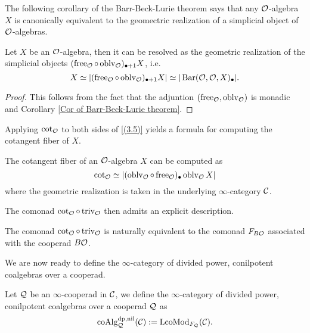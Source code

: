 The following corollary of the Barr-Beck-Lurie theorem says that any ${\mathcal{O}}$-algebra $X$ is canonically equivalent to the geomectric realization of a simplicial object of ${\mathcal{O}}$-algebras.
\begin{proposition}
\label{free resolutino of O-algebras}
Let $X$ be an ${\mathcal{O}}$-algebra, then it can be resolved as the geometric realization of the simplicial objects $(\operatorname{free}_{{\mathcal{O}}}\circ \operatorname{oblv}_{{\mathcal{O}}})_{\bullet + 1}X$, i.e. 
\begin{equation}
\label{(3.5)}
    X \simeq
|(\operatorname{free}_{{\mathcal{O}}}\circ \operatorname{oblv}_{{\mathcal{O}}})_{\bullet + 1}X|
\simeq |\operatorname{Bar}({\mathcal{O}}, {\mathcal{O}}, X)_{\bullet}|.
\end{equation}
\end{proposition}
\begin{proof}
    This follows from the fact that the adjuntion $(\operatorname{free}_{{\mathcal{O}}}, \operatorname{oblv}_{{\mathcal{O}}})$ is monadic and Corollary \ref{Cor of Barr-Beck-Lurie theorem}.
    
\end{proof}
Applying $\cot_{{\mathcal{O}}}$ to both sides of \eqref{(3.5)} yields a formula for computing the cotangent fiber of $X$. 
\begin{corollary}
\cite[Proposition 4.4]{Heuts_Koszul}
The cotangent fiber of an ${\mathcal{O}}$-algebra $X$ can be computed as 
$$
\cot_{{\mathcal{O}}} \simeq 
|(\operatorname{oblv}_{{\mathcal{O}}}\circ \operatorname{free}_{{\mathcal{O}}})_{\bullet}\operatorname{oblv}_{{\mathcal{O}}}X|
$$
where the geometric realization is taken in the underlying $\infty$-category ${\mathcal{C}}$.
\end{corollary}

The comonad $\cot_{{\mathcal{O}}}\circ \operatorname{triv}_{{\mathcal{O}}}$ then admits an explicit description.
\begin{proposition}
\label{cot triv is F_BO}
\cite[Proposition 4.5]{Heuts_Koszul}
The comonad $\cot_{{\mathcal{O}}}\circ \operatorname{triv}_{{\mathcal{O}}}$ is naturally equivalent to the comonad $F_{B{\mathcal{O}}}$ associated with the cooperad $B{\mathcal{O}}$.
\end{proposition}

We are now ready to define the $\infty$-category of divided power, conilpotent coalgebras over a cooperad.
\begin{definition}
\label{coalgebras over a cooperad}
	Let ${\mathcal{Q}}$ be an $\infty$-cooperad in ${\mathcal{C}}$, we define the $\infty$-category of divided power, conilpotent coalgebras over a cooperad ${\mathcal{Q}}$ as 
	$$
	\operatorname{coAlg}^{\operatorname{dp}, \operatorname{nil}}_{{\mathcal{Q}}}({\mathcal{C}}):= \operatorname{LcoMod}_{F_{{\mathcal{Q}}}}({\mathcal{C}}).
	$$
\end{definition}

